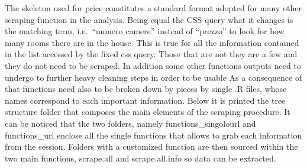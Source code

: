\documentclass[
  12pt,
  a4paper,
  oneside]{book}
\newenvironment{Shaded}{\begin{snugshade}}{\end{snugshade}}
\newcommand{\DataTypeTok}[1]{\textcolor[rgb]{0.13,0.29,0.53}{#1}}
\newcommand{\ErrorTok}[1]{\textcolor[rgb]{0.64,0.00,0.00}{\textbf{#1}}}
\newcommand{\KeywordTok}[1]{\textcolor[rgb]{0.13,0.29,0.53}{\textbf{#1}}}
\newcommand{\NormalTok}[1]{#1}
\newcommand{\StringTok}[1]{\textcolor[rgb]{0.31,0.60,0.02}{#1}}
\theoremstyle{definition}
\theoremstyle{definition}
\theoremstyle{definition}
\theoremstyle{remark}
\begin{document}
\begin{Shaded}
\begin{Highlighting}[]
{\NormalTok{                  ...}
                  
\NormalTok{                   combine =}\StringTok{ }\KeywordTok{tibble}\NormalTok{(}\DataTypeTok{ID        =}\NormalTok{ id,}
                                     \DataTypeTok{LAT       =}\NormalTok{ lat, }
                                     \DataTypeTok{LONG      =}\NormalTok{ long,}
                                     \DataTypeTok{LOCATION  =}\NormalTok{ location,}
                                     \DataTypeTok{CONDOM    =}\NormalTok{ condom,}
                                     \DataTypeTok{BUILDAGE  =}\NormalTok{ buildage,}
                                    
\NormalTok{                  ...}
                  
                  
                  \KeywordTok{return}\NormalTok{(combine) }
                  \ErrorTok{\}}
  \KeywordTok{stopCluster}\NormalTok{(cl)}
  \KeywordTok{return}\NormalTok{(ALL)}
\ErrorTok{\}}
\end{Highlighting}
\end{Shaded}

The skeleton used for price constitutes a standard format adopted for many other scraping function in the analysis. Being equal the CSS query what it changes is the matching term, i.e.~``numero camere'' instead of ``prezzo'' to look for how many rooms there are in the house. This is true for all the information contained in the list accessed by the fixed css query. Those that are not they are a few and they do not need to be scraped.
In addition some other functions outputs need to undergo to further heavy cleaning steps in order to be usable As a consequence of that functions need also to be broken down by pieces by single .R files, whose names correspond to each important information.
Below it is printed the tree structure folder that composes the main elements of the scraping procedure. It can be noticed that the two folders, namely functions\_singolourl and functions\_url enclose all the single functions that allows to grab each information from the session. Folders with a customized function are then sourced within the two main functions, scrape.all and scrape.all.info so data can be extracted.
\end{document}

